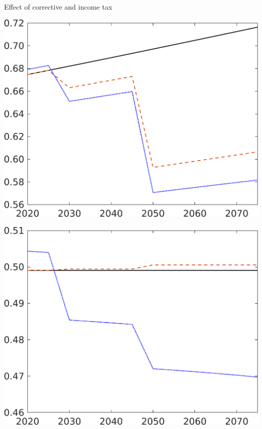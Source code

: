\documentclass[11pt,aspectratio=169]{beamer}
\begin{document}
\begin{frame}{Effect of corrective and income tax}
	\centering
	\begin{minipage}[]{0.3\textwidth}
		\includegraphics[width=1\textwidth]{../codding_model/own_basedOnFried/optimalPol_elastS_DisuSci/figures/all_1705/CompCounterFac_withLF_taufopt1_taulopt0_C_spillover0_noskill0_sep1_BN0_ineq0_red0_xgrowth0_etaa0.79_lgd0.png}
	\end{minipage}
	\begin{minipage}[]{0.3\textwidth}
		\includegraphics[width=1\textwidth]{../codding_model/own_basedOnFried/optimalPol_elastS_DisuSci/figures/all_1705/CompCounterFac_withLF_taufopt1_taulopt0_hh_spillover0_noskill0_sep1_BN0_ineq0_red0_xgrowth0_etaa0.79_lgd0.png}

\end{minipage}
\end{frame}
\end{document}
